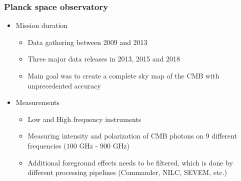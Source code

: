 \begin{frame}
\frametitle{Planck space observatory}

\begin{itemize}
	\item<1-> Mission duration
	\begin{itemize}
		\item<1-> Data gathering between 2009 and 2013
		\item<1-> Three major data releases in 2013, 2015 and 2018
		\item<1-> Main goal was to create a complete sky map of the CMB with unprecedented accuracy
	\end{itemize}
	\item<2-> Measurements
	\begin{itemize}
		\item<2-> Low and High frequency instruments
		\item<2-> Measuring intensity and polarization of CMB photons on 9 different frequencies ($100$ GHz - $900$ GHz)
		\item<2-> Additional foreground effects needs to be filtered, which is done by different processing pipelines (Commander, NILC, SEVEM, etc.)
	\end{itemize}
\end{itemize}

\end{frame}